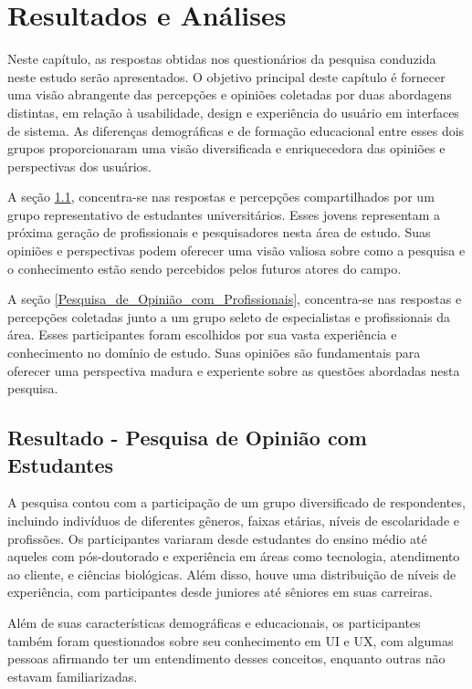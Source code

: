 \chapter[Resultados]{Resultados e Análises}

Neste capítulo, as respostas obtidas nos questionários da pesquisa conduzida neste estudo serão apresentados. O objetivo principal deste capítulo é fornecer uma visão abrangente das percepções e opiniões coletadas por duas abordagens distintas, em relação à usabilidade, design e experiência do usuário em interfaces de sistema. As diferenças demográficas e de formação educacional entre esses dois grupos proporcionaram uma visão diversificada e enriquecedora das opiniões e perspectivas dos usuários.

A seção \ref{Pesquisa_de_Opinião_com_Estudantes}, concentra-se nas respostas e percepções compartilhados por um grupo representativo de estudantes universitários. Esses jovens representam a próxima geração de profissionais e pesquisadores nesta área de estudo. Suas opiniões e perspectivas podem oferecer uma visão valiosa sobre como a pesquisa e o conhecimento estão sendo percebidos pelos futuros atores do campo.

A seção \ref{Pesquisa_de_Opinião_com_Profissionais}, concentra-se nas respostas e percepções coletadas junto a um grupo seleto de especialistas e profissionais da área. Esses participantes foram escolhidos por sua vasta experiência e conhecimento no domínio de estudo. Suas opiniões são fundamentais para oferecer uma perspectiva madura e experiente sobre as questões abordadas nesta pesquisa.

\section{Resultado - Pesquisa de Opinião com Estudantes}
\label{Pesquisa_de_Opinião_com_Estudantes}
A pesquisa contou com a participação de um grupo diversificado de respondentes, incluindo indivíduos de diferentes gêneros, faixas etárias, níveis de escolaridade e profissões. Os participantes variaram desde estudantes do ensino médio até aqueles com pós-doutorado e experiência em áreas como tecnologia, atendimento ao cliente, e ciências biológicas. Além disso, houve uma distribuição de níveis de experiência, com participantes desde juniores até sêniores em suas carreiras.

Além de suas características demográficas e educacionais, os participantes também foram questionados sobre seu conhecimento em \ac{UI} e \ac{UX}, com algumas pessoas afirmando ter um entendimento desses conceitos, enquanto outras não estavam familiarizadas.

